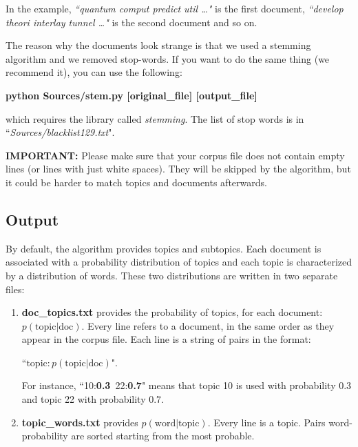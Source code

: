 \documentclass[11pt]{article}
\begin{document}
In the example, 
\textit{``quantum comput predict util  \dots"}
is the first document, 
\textit{``develop theori interlay tunnel \dots"}
is the second document and so on.

The reason why the documents look strange is that we used a stemming algorithm and we removed stop-words. If you want to do the same thing (we recommend it),  you can use the following:

\textbf{python Sources/stem.py [original\_file] [output\_file]}

which requires the library called \textit{stemming}. The list of stop words is in ``\textit{Sources/blacklist129.txt}".

\textbf{IMPORTANT:} Please make sure that your corpus file does not contain empty lines (or lines with just white spaces). They will be skipped by the algorithm, but it could be harder to match topics and documents afterwards.



\subsection{Output}

By default, the algorithm provides topics and subtopics. Each document is associated with a probability distribution of topics and each topic is characterized by a  distribution of words. These two distributions are written in two separate files:

\begin{enumerate}
  \item \textbf{doc\_topics.txt} provides the probability of topics, for each document: $p(\textrm{topic}|\textrm{doc})$. Every line refers to a document, in the same order as they appear in the corpus file. Each line is a string of pairs in the format:
 
 ``$\textrm{topic}:p(\textrm{topic} | \textrm{doc})$". 
  
 For instance, ``10:\textbf{0.3}~22:\textbf{0.7}" means that topic 10 is used with probability $0.3$ and topic 22 with probability $0.7$.

  \item  \textbf{topic\_words.txt} provides $p(\textrm{word}|\textrm{topic})$. Every line is a topic. Pairs word-probability are sorted starting from the most probable. 
\end{enumerate}
\end{document}
